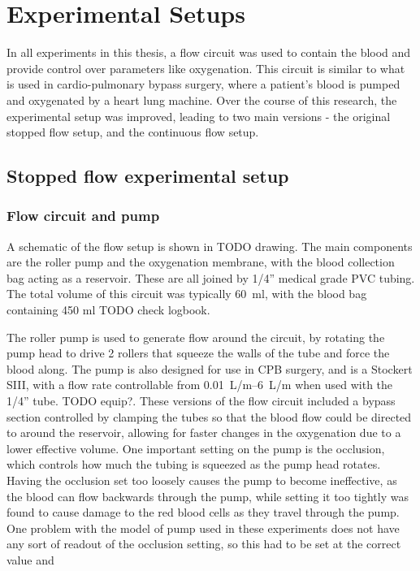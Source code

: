 \chapter{Experimental Setups}
\label{ch:exptsetup}

In all experiments in this thesis, a flow circuit was used to contain the blood and provide control over parameters like oxygenation.
This circuit is similar to what is used in cardio-pulmonary bypass surgery, where a patient's blood is pumped and oxygenated by a heart lung machine.
Over the course of this research, the experimental setup was improved, leading to two main versions - the original stopped flow setup, and the continuous flow setup.

\section{Stopped flow experimental setup}
\label{sec:exptsetup-stopflow}

\subsection{Flow circuit and pump}

A schematic of the flow setup is shown in TODO drawing.
The main components are the roller pump and the oxygenation membrane, with the blood collection bag acting as a reservoir.
These are all joined by 1/4'' medical grade PVC tubing.
The total volume of this circuit was typically \SI{60}{\milli\litre}, with the blood bag containing 450 ml TODO check logbook.

The roller pump is used to generate flow around the circuit, by rotating the pump head to drive 2 rollers that squeeze the walls of the tube and force the blood along.
The pump is also designed for use in CPB surgery, and is a Stockert SIII, with a flow rate controllable from \SIrange{0.01}{6}{L/m} when used with the 1/4'' tube. TODO equip?.
These versions of the flow circuit included a bypass section controlled by clamping the tubes so that the blood flow could be directed to around the reservoir, allowing for faster changes in the oxygenation due to a lower effective volume.
One important setting on the pump is the occlusion, which controls how much the tubing is squeezed as the pump head rotates.
Having the occlusion set too loosely causes the pump to become ineffective, as the blood can flow backwards through the pump, while setting it too tightly was found to cause damage to the red blood cells as they travel through the pump.
One problem with the model of pump used in these experiments does not have any sort of readout of the occlusion setting, so this had to be set at the correct value and

